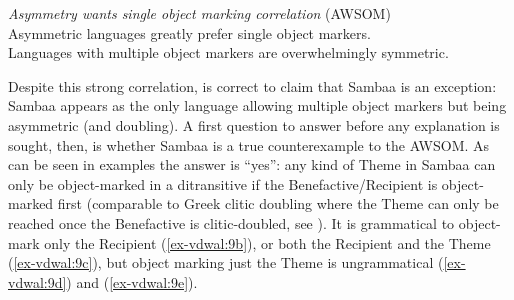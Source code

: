 \documentclass[output=paper
,modfonts
,nonflat]{langsci/langscibook}
\begin{document}
\begin{exe}
\ex \label{ex-vdwal:8} \textit{Asymmetry wants single object marking correlation} (AWSOM)\\ 
Asymmetric languages greatly prefer single object markers.\\
Languages with multiple object markers are overwhelmingly symmetric.
\end{exe}
\noindent Despite this strong correlation, \citet{Riedel2009} is correct to claim that Sambaa is an exception: Sambaa appears as the only language allowing multiple object markers but being asymmetric (and doubling). A first question to answer before any explanation is sought, then, is whether Sambaa is a true counterexample to the AWSOM. As can be seen in examples  the answer is ``yes'': any kind of Theme in Sambaa can only be object-marked in a ditransitive if the Benefactive/Recipient is object-marked first (comparable to Greek clitic doubling where the Theme can only be reached once the Benefactive is clitic-doubled, see \citealt{Anagnostopoulou2003, Anagnostopoulou2014}).
It is grammatical to object-mark only the Recipient (\ref{ex-vdwal:9b}), or both the Recipient and the Theme (\ref{ex-vdwal:9c}), but object marking just the Theme is ungrammatical (\ref{ex-vdwal:9d}) and (\ref{ex-vdwal:9e}).
\end{document}
